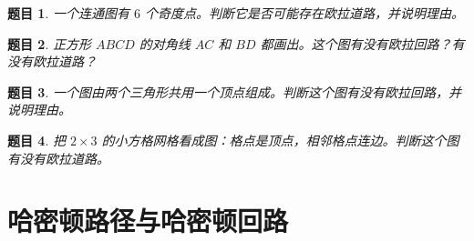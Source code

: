 \documentclass[11pt,a4paper,fontset=fandol]{ctexart}
\theoremstyle{formalexample}
\newtheorem{exercise}{题目}[section]
\begin{document}
\begin{exercise}
一个连通图有 $6$ 个奇度点。判断它是否可能存在欧拉道路，并说明理由。
\end{exercise}

\begin{exercise}
正方形 $ABCD$ 的对角线 $AC$ 和 $BD$ 都画出。这个图有没有欧拉回路？有没有欧拉道路？
\end{exercise}

\begin{exercise}
一个图由两个三角形共用一个顶点组成。判断这个图有没有欧拉回路，并说明理由。
\end{exercise}

\begin{exercise}
把 $2\times 3$ 的小方格网格看成图：格点是顶点，相邻格点连边。判断这个图有没有欧拉道路。
\end{exercise}

\section{哈密顿路径与哈密顿回路}
\end{document}
